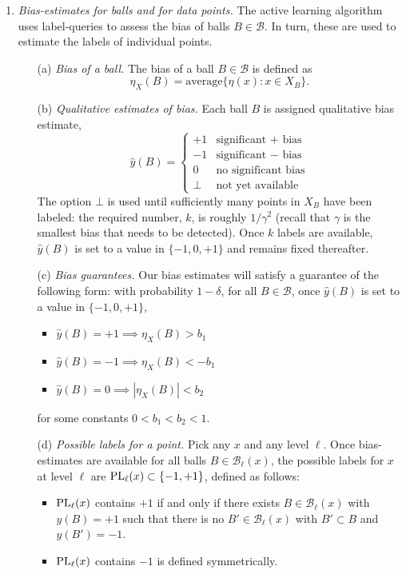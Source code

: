 \documentclass{article}
\def\B{{\mathcal B}}
\def\yh{{\widehat{y}}}
\def\PL{{\rm PL}}
\begin{document}
\begin{enumerate}
\begin{enumerate}
\end{enumerate}

\item {\it Bias-estimates for balls and for data points.} The active learning algorithm uses label-queries to assess the bias of balls $B \in \B$. In turn, these are used to estimate the labels of individual points.

\begin{enumerate}

\item[(a)] {\it Bias of a ball.} The bias of a ball $B \in \B$ is defined as
$$ \eta_X(B) = \mbox{average}\{\eta(x): x \in X_B \} .$$

\item[(b)] {\it Qualitative estimates of bias.} Each ball $B$ is assigned qualitative bias estimate,
$$ \yh(B) = 
\left\{
\begin{array}{cl}
+1 & \mbox{significant $+$ bias} \\
-1 & \mbox{significant $-$ bias} \\
0 & \mbox{no significant bias} \\
\bot & \mbox{not yet available}
\end{array}
\right.
$$
The option $\bot$ is used until sufficiently many points in $X_B$ have been labeled: the required number, $k$, is roughly $1/\gamma^2$ (recall that $\gamma$ is the smallest bias that needs to be detected). Once $k$ labels are available, $\yh(B)$ is set to a value in $\{-1,0,+1\}$ and remains fixed thereafter.

\item[(c)] {\it Bias guarantees.} Our bias estimates will satisfy a guarantee of the following form: with probability $1-\delta$, for all $B \in \B$, once $\yh(B)$ is set to a value in $\{-1,0,+1\}$, 
\begin{itemize}
\item $\yh(B) = +1 \implies \eta_X(B) > b_1$
\item $\yh(B) = -1 \implies \eta_X(B) < -b_1$
\item $\yh(B) = 0 \implies |\eta_X(B)| < b_2$
\end{itemize}
for some constants $0 < b_1 < b_2 < 1$.

\item[(d)] {\it Possible labels for a point.} Pick any $x$ and any level $\ell$. Once bias-estimates are available for all balls $B \in \B_\ell(x)$, the possible labels for $x$ at level $\ell$ are $\PL_\ell(x) \subset \{-1,+1\}$, defined as follows:
\begin{itemize}
\item $\PL_\ell(x)$ contains $+1$ if and only if there exists $B \in \B_\ell(x)$ with $y(B) = +1$ such that there is no $B' \in \B_\ell(x)$ with $B' \subset B$ and $y(B') = -1$.
\item $\PL_\ell(x)$ contains $-1$ is defined symmetrically.
\end{itemize}


\end{enumerate}
\end{enumerate}
\end{document}
